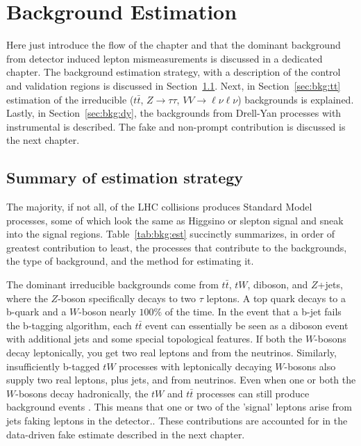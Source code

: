 \chapter{Background Estimation}
Here just introduce the flow of the chapter and that the dominant background from detector induced lepton mismeasurements is discussed in a dedicated chapter.  The background estimation strategy, with a description of the control and validation regions is discussed in Section~\ref{sec:bkg:summary}.  Next, in Section~\ref{sec:bkg:tt} estimation of the irreducible ($t\bar{t}$, $Z\rightarrow\tau\tau$, $VV\rightarrow\ell\nu\ell\nu$) backgrounds is explained.  Lastly, in Section~\ref{sec:bkg:dy}, the backgrounds from Drell-Yan processes with instrumental \met is described.  The fake and non-prompt contribution is discussed is the next chapter.

\section{Summary of estimation strategy}
\label{sec:bkg:summary}
The majority, if not all, of the LHC collisions produces Standard Model processes, some of which look the same as Higgsino or slepton signal and sneak into the signal regions.  Table~\ref{tab:bkg:est} succinctly summarizes, in order of greatest contribution to least, the processes that contribute to the backgrounds, the type of background, and the method for estimating it. 

The dominant irreducible backgrounds come from $t\bar{t}$, $tW$, diboson, and $Z$+jets, where the $Z$-boson specifically decays to two $\tau$ leptons.  A top quark decays to a b-quark and a $W$-boson nearly $100\%$ of the time.  In the event that a b-jet fails the b-tagging algorithm, each $t\bar{t}$ event can essentially be seen as a diboson event with additional jets and some special topological features.  If both the $W$-bosons decay leptonically, you get two real leptons and \met from the neutrinos.  Similarly, insufficiently b-tagged $tW$ processes with leptonically decaying $W$-bosons also supply two real leptons, plus jets, and \met from neutrinos.  Even when one or both the $W$-bosons decay hadronically, the $tW$ and $t\bar{t}$ processes can still produce background events .  This means that one or two of the 'signal' leptons arise from jets faking leptons in the detector..  These contributions are accounted for in the data-driven fake estimate described in the next chapter.  

